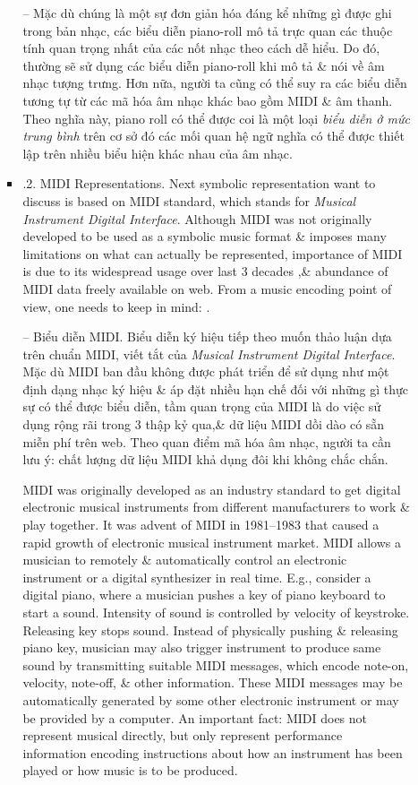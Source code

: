 \documentclass{article}
\begin{document}
\begin{itemize}
\begin{itemize}
\begin{itemize}
			-- Mặc dù chúng là một sự đơn giản hóa đáng kể những gì được ghi trong bản nhạc, các biểu diễn piano-roll mô tả trực quan các thuộc tính quan trọng nhất của các nốt nhạc theo cách dễ hiểu. Do đó, thường sẽ sử dụng các biểu diễn piano-roll khi mô tả \& nói về âm nhạc tượng trưng. Hơn nữa, người ta cũng có thể suy ra các biểu diễn tương tự từ các mã hóa âm nhạc khác bao gồm MIDI \& âm thanh. Theo nghĩa này, piano roll có thể được coi là một loại {\it biểu diễn ở mức trung bình} trên cơ sở đó các mối quan hệ ngữ nghĩa có thể được thiết lập trên nhiều biểu hiện khác nhau của âm nhạc.
			\item {.2. MIDI Representations.} Next symbolic representation want to discuss is based on MIDI standard, which stands for {\it Musical Instrument Digital Interface}. Although MIDI was not originally developed to be used as a symbolic music format \& imposes many limitations on what can actually be represented, importance of MIDI is due to its widespread usage over last 3 decades ,\& abundance of MIDI data freely available on web. From a music encoding point of view, one needs to keep in mind: .
			
			-- {\sf Biểu diễn MIDI.} Biểu diễn ký hiệu tiếp theo muốn thảo luận dựa trên chuẩn MIDI, viết tắt của {\it Musical Instrument Digital Interface}. Mặc dù MIDI ban đầu không được phát triển để sử dụng như một định dạng nhạc ký hiệu \& áp đặt nhiều hạn chế đối với những gì thực sự có thể được biểu diễn, tầm quan trọng của MIDI là do việc sử dụng rộng rãi trong 3 thập kỷ qua,\& dữ liệu MIDI dồi dào có sẵn miễn phí trên web. Theo quan điểm mã hóa âm nhạc, người ta cần lưu ý: chất lượng dữ liệu MIDI khả dụng đôi khi không chắc chắn.
			
			MIDI was originally developed as an industry standard to get digital electronic musical instruments from different manufacturers to work \& play together. It was advent of MIDI in 1981--1983 that caused a rapid growth of electronic musical instrument market. MIDI allows a musician to remotely \& automatically control an electronic instrument or a digital synthesizer in real time. E.g., consider a digital piano, where a musician pushes a key of piano keyboard to start a sound. Intensity of sound is controlled by velocity of keystroke. Releasing key stops sound. Instead of physically pushing \& releasing piano key, musician may also trigger instrument to produce same sound by transmitting suitable MIDI messages, which encode note-on, velocity, note-off, \& other information. These MIDI messages may be automatically generated by some other electronic instrument or may be provided by a computer. An important fact: MIDI does not represent musical directly, but only represent performance information encoding instructions about how an instrument has been played or how music is to be produced.
			

\end{itemize}
\end{itemize}
\end{itemize}
\end{document}
